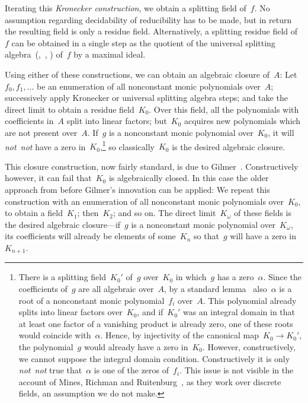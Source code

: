 \documentclass[com,11pt,crcready]{iosart2x}
\theoremstyle{definition}
\theoremstyle{plain}
\theoremstyle{remark}
\newcommand{\?}{\,{:}\,}
\renewcommand{\_}{\mathpunct{.}\,}
\begin{document}
Iterating this \emph{Kronecker construction}, we obtain a splitting field of~$f$. No
assumption regarding decidability of reducibility has to be made, but in return
the resulting field is only a residue field. Alternatively, a splitting residue field
of~$f$ can be obtained in a single step as the quotient of the universal
splitting
algebra~(\cite[Section~III.4]{lombardi-quitte:constructive-algebra},~\cite[Section~2.1]{pohst-zassenhaus:aant},
\cite{richman:splitting}) of~$f$ by a maximal ideal.

Using either of these constructions, we can obtain an algebraic closure of~$A$:
Let~$f_0,f_1,\ldots$ be an enumeration of all nonconstant monic polynomials over~$A$;
successively apply Kronecker or universal splitting algebra steps; and take the
direct limit to obtain a residue field~$K_0$. Over this field, all the
polynomials with coefficients in~$A$ split into linear factors; but~$K_0$
acquires new polynomials which are not present over~$A$.
If~$g$ is a nonconstant monic polynomial over~$K_0$,
it will \emph{not~not} have a zero in~$K_0$,\footnote{There is a splitting
field~$K_0'$ of~$g$ over~$K_0$ in which~$g$ has a zero~$\alpha$. Since the
coefficients of~$g$ are all algebraic over~$A$, by a standard
lemma~\cite[Corollary~VI.1.5]{mines-richman-ruitenburg:constructive-algebra} also~$\alpha$ is a root of a
nonconstant monic polynomial~$f_i$ over~$A$. This polynomial already splits into linear
factors over~$K_0$, and if~$K_0'$ was an integral domain in that at least one
factor of a vanishing product is already zero, one of these roots would
coincide with~$\alpha$. Hence, by injectivity of the canonical map~$K_0 \to
K_0'$, the polynomial~$g$ would already have a zero in~$K_0$. However,
constructively, we cannot suppose the integral domain condition. Constructively
it is only \emph{not~not} true that~$\alpha$ is one of the zeros of~$f_i$.
This issue is not visible in the account of
Mines, Richman and Ruitenburg~\cite[Theorem~VI.3.5]{mines-richman-ruitenburg:constructive-algebra},
as they work over discrete fields, an assumption we do not make.} so
classically~$K_0$ is the desired algebraic closure.

This closure construction, now fairly standard, is due to
Gilmer~\cite{gilmer:algebraic-closure,richman:splitting,conrad:algebraic-closure}.
Constructively however, it can fail that~$K_0$ is algebraically closed. In this
case the older approach from before Gilmer's innovation can be applied:
We repeat this construction with an enumeration of all nonconstant monic
polynomials over~$K_0$, to obtain a field~$K_1$; then~$K_2$; and so on. The
direct limit~$K_\omega$ of these fields is the desired algebraic
closure---if~$g$ is a nonconstant monic polynomial over~$K_\omega$, its coefficients will
already be elements of some~$K_n$ so that~$g$ will have a zero in~$K_{n+1}$.
\end{document}
